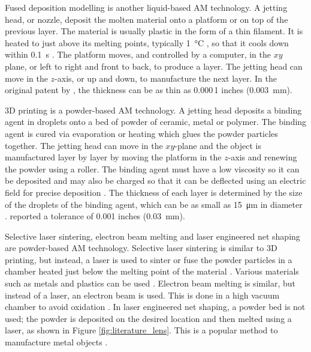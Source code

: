 Fused deposition modelling is another liquid-based AM technology. A jetting head, or nozzle, deposit the molten material onto a platform or on top of the previous layer. The material is usually plastic in the form of a thin filament. It is heated to just above its melting points, typically \SI{1}{\degreeCelsius} \citep{crump1992apparatus}, so that it cools down within \SI{0.1}{\second} \citep{kruth1991material}. The platform moves, and controlled by a computer, in the $xy$ plane, or left to right and front to back, to produce a layer. The jetting head can move in the $z$-axis, or up and down, to manufacture the next layer. In the original patent by \cite{crump1992apparatus}, the thickness can be as thin as 0.000\,1 inches (\SI{0.003}{\milli\metre}).

3D printing is a powder-based AM technology. A jetting head deposits a binding agent in droplets onto a bed of powder of ceramic, metal or polymer. The binding agent is cured via evaporation or heating which glues the powder particles together. The jetting head can move in the $xy$-plane and the object is manufactured layer by layer by moving the platform in the $z$-axis and renewing the powder using a roller. The binding agent must have a low viscosity so it can be deposited and may also be charged so that it can be deflected using an electric field for precise deposition \citep{sachs1990three}. The thickness of each layer is determined by the size of the droplets of the binding agent, which can be as small as \SI{15}{\micro\metre} in diameter \citep{sachs1990three}. \cite{sachs1990three} reported a tolerance of 0.001 inches (\SI{0.03}{\milli\metre}).

Selective laser sintering, electron beam melting and laser engineered net shaping are powder-based AM technology. Selective laser sintering is similar to 3D printing, but instead, a laser is used to sinter or fuse the powder particles in a chamber heated just below the melting point of the material \citep{wong2012review}. Various materials such as metals and plastics can be used \citep{wong2012review}. Electron beam melting is similar, but instead of a laser, an electron beam is used. This is done in a high vacuum chamber to avoid oxidation \citep{wong2012review}. In laser engineered net shaping, a powder bed is not used; the powder is deposited on the desired location and then melted using a laser, as shown in Figure \ref{fig:literature_lens}. This is a popular method to manufacture metal objects \citep{gibson2010additive}.

